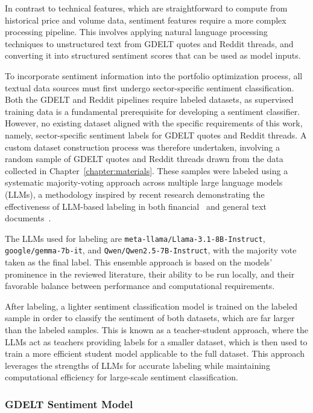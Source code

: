In contrast to technical features, which are straightforward to compute from historical price and volume data, sentiment features require a more complex processing pipeline. This involves applying natural language processing techniques to unstructured text from GDELT quotes and Reddit threads, and converting it into structured sentiment scores that can be used as model inputs.

To incorporate sentiment information into the portfolio optimization process, all textual data sources must first undergo sector-specific sentiment classification. Both the GDELT and Reddit pipelines require labeled datasets, as supervised training data is a fundamental prerequisite for developing a sentiment classifier. However, no existing dataset aligned with the specific requirements of this work, namely, sector-specific sentiment labels for GDELT quotes and Reddit threads. A custom dataset construction process was therefore undertaken, involving a random sample of GDELT quotes and Reddit threads drawn from the data collected in Chapter~\ref{chapter:materials}. These samples were labeled using a systematic majority-voting approach across multiple large language models (LLMs), a methodology inspired by recent research demonstrating the effectiveness of LLM-based labeling in both financial~\cite{315e0} and general text documents~\cite{69797, f426b}.

The LLMs used for labeling are \texttt{meta-llama/Llama-3.1-8B-Instruct}, \texttt{google/gemma-7b-it}, and \texttt{Qwen/Qwen2.5-7B-Instruct}, with the majority vote taken as the final label. This ensemble approach is based on the models' prominence in the reviewed literature, their ability to be run locally, and their favorable balance between performance and computational requirements.

After labeling, a lighter sentiment classification model is trained on the labeled sample in order to classify the sentiment of both datasets, which are far larger than the labeled samples. This is known as a teacher-student approach, where the LLMs act as teachers providing labels for a smaller dataset, which is then used to train a more efficient student model applicable to the full dataset. This approach leverages the strengths of LLMs for accurate labeling while maintaining computational efficiency for large-scale sentiment classification.

\subsubsection{GDELT Sentiment Model}


